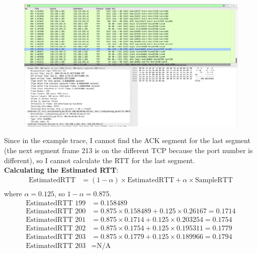 \documentclass{article}
\begin{document}
\begin{CJK*}{UTF8}{gbsn}
\begin{figure}[H]
    \centering
    \includegraphics[width=1\textwidth]{7-1.png}
\end{figure}
Since in the example trace, I cannot find the ACK segment for the last segment (the next segment frame 213
is on the different TCP because the port number is different), so I cannot calculate the RTT for the last segment.
\\\textbf{Calculating the Estimated RTT}:
\begin{align*}
    \text{EstimatedRTT} &= (1-\alpha) \times \text{EstimatedRTT} + \alpha \times \text{SampleRTT} \\
\end{align*}
where $\alpha = 0.125$, so $1-\alpha = 0.875$.
\begin{align*}
    \text{EstimatedRTT 199} &= 0.158489 \\
    \text{EstimatedRTT 200} &= 0.875 \times 0.158489 + 0.125 \times 0.26167 = 0.1714 \\
    \text{EstimatedRTT 201} &= 0.875 \times 0.1714 + 0.125 \times 0.203254 = 0.1754 \\
    \text{EstimatedRTT 202} &= 0.875 \times 0.1754 + 0.125 \times 0.195311 = 0.1779 \\
    \text{EstimatedRTT 203} &= 0.875 \times 0.1779 + 0.125 \times 0.189966 = 0.1794 \\
    \text{EstimatedRTT 203} &= \text{N/A} \\
\end{align*}

\end{CJK*}
\end{document}
